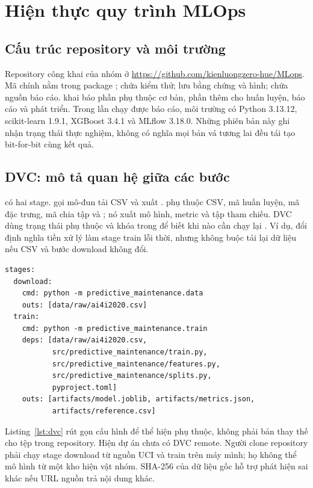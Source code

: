 \chapter{Hiện thực quy trình MLOps}
\section{Cấu trúc repository và môi trường}
Repository công khai của nhóm ở \url{https://github.com/kienluongzero-hue/MLops}. Mã chính nằm trong package ;  chứa kiểm thử;  lưu bằng chứng và hình;  chứa nguồn báo cáo.  khai báo phần phụ thuộc cơ bản, phần thêm cho huấn luyện, báo cáo và phát triển. Trong lần chạy được báo cáo, môi trường có Python 3.13.12, scikit-learn 1.9.1, XGBoost 3.4.1 và MLflow 3.18.0. Những phiên bản này ghi nhận trạng thái thực nghiệm, không có nghĩa mọi bản vá tương lai đều tái tạo bit-for-bit cùng kết quả.

\section{DVC: mô tả quan hệ giữa các bước}
 có hai stage.  gọi mô-đun tải CSV và xuất .  phụ thuộc CSV, mã huấn luyện, mã đặc trưng, mã chia tập và ; nó xuất mô hình, metric và tập tham chiếu. DVC dùng trạng thái phụ thuộc và khóa trong  để biết khi nào cần chạy lại \cite{dvc}. Ví dụ, đổi định nghĩa tiền xử lý làm stage train lỗi thời, nhưng không buộc tải lại dữ liệu nếu CSV và bước download không đổi.

\begin{lstlisting}[language={},caption={Hai stage chính trong cấu hình DVC},label={lst:dvc}]
stages:
  download:
    cmd: python -m predictive_maintenance.data
    outs: [data/raw/ai4i2020.csv]
  train:
    cmd: python -m predictive_maintenance.train
    deps: [data/raw/ai4i2020.csv,
           src/predictive_maintenance/train.py,
           src/predictive_maintenance/features.py,
           src/predictive_maintenance/splits.py,
           pyproject.toml]
    outs: [artifacts/model.joblib, artifacts/metrics.json,
           artifacts/reference.csv]
\end{lstlisting}
Listing~\ref{lst:dvc} rút gọn cấu hình để thể hiện phụ thuộc, không phải bản thay thế cho tệp trong repository. Hiện dự án chưa có DVC remote. Người clone repository phải chạy stage download từ nguồn UCI và train trên máy mình; họ không thể  mô hình từ một kho hiện vật nhóm. SHA-256 của dữ liệu gốc hỗ trợ phát hiện sai khác nếu URL nguồn trả nội dung khác.


